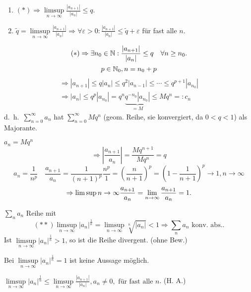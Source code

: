 \documentclass[../ana1.tex]{subfiles}
\begin{document}
\begin{bew}
	\begin{enumerate}
		\item \( (*) \Rightarrow \limsup\limits_{n\rightarrow\infty} \frac{|a_{n+1}|}{|a_n|} \leq q. \)
		\item \( \tilde{q} = \limsup\limits_{n\rightarrow\infty} \frac{|a_{n+1}|}{|a_n|} \Rightarrow \forall\varepsilon>0: \frac{|a_{n+1}|}{|a_n|} \leq \tilde{q} + \varepsilon \) für fast alle \(n\).
	\end{enumerate}
	\[ (*)\Rightarrow\exists n_0 \in\mathbb{N}: \frac{|a_{n+1}|}{|a_n|} \leq q \quad\forall n\geq n_0. \]
	\[ p\in\mathbb{N}_0, n=n_0 + p \]
	\begin{align*}
		\Rightarrow |a_{n+1}| \leq q |a_n| \leq q^2|a_{n-1}| \leq \cdots\leq q^{p+1}|a_{n_0}|\\
		\Rightarrow |a_n| \leq q^p |a_{n_0}| = q^n \underbrace{q^{-n_0}|a_{n_0}|}_{=M} \leq M q^n =: c_n
	\end{align*}
	d.\ h.\  \( \sum_{n=0}^{\infty}a_n \) hat \( \sum_{n=0}^{\infty}M q^n \) (geom. Reihe, sie konvergiert, da \( 0<q<1 \)) als Majorante.
\end{bew}
\begin{bem}
	\( a_n = M q^n \)
	\[ \Rightarrow \left| \frac{a_{n+1}}{a_n} \right| = \frac{M q^{n+1}}{M q^n} = q \]
	\[ a_n = \frac{1}{n^p} \quad \frac{a_{n+1}}{a_n} = \frac{1}{{(n+1)}^p} \frac{n^p}{1} = {\left(\frac{n}{n+1}\right)}^p = {\left(1 - \frac{1}{n+1}\right)}^p \rightarrow 1, n\rightarrow\infty \]
	\[ \Rightarrow \limsup\limits{n\rightarrow\infty} \frac{a_{n+1}}{a_n} = \lim\limits_{n\rightarrow\infty} \frac{a_{n+1}}{a_n} = 1. \]
\end{bem}
\begin{satz}[Wurzelkriterium]
	\( \sum_{n}a_n \) Reihe mit \[ (**) \limsup\limits_{n\rightarrow\infty} |a_n|^{\frac{1}{n}} = \limsup\limits_{n\rightarrow\infty} \sqrt[n]{|a_n|} < 1 \Rightarrow \sum_n a_n \text{ konv.\ abs.}.\]
	Ist \( \limsup\limits_{n\rightarrow\infty} |a_n|^{\frac{1}{n}} > 1 \), so ist die Reihe divergent. (ohne Bew.) 
\end{satz}
\begin{bem}
	Bei \( \limsup\limits_{n\rightarrow\infty} |a_n|^{\frac{1}{n}} = 1 \) ist keine Aussage möglich.
\end{bem}
\begin{bem}
	\( \limsup\limits_{n\rightarrow\infty} |a_n|^{\frac{1}{n}} \leq \limsup\limits_{n\rightarrow\infty} \frac{|a_{n+1}|}{|a_n|}, a_n \neq 0, \text{ für fast alle } n \). (H. A.)
\end{bem}
\end{document}
